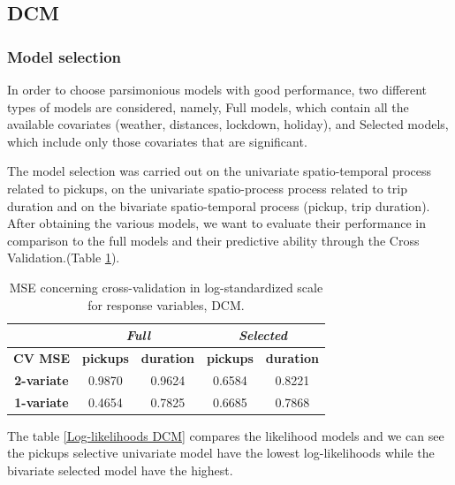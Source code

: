 \subsection{DCM}

\subsubsection{Model selection}
In order to choose  parsimonious models with good performance, two different types of models are considered, namely, Full models, which contain all the available covariates (weather, distances, lockdown, holiday), and Selected models, which include only those covariates that are significant. 

The model selection was carried out on the univariate spatio-temporal process related to pickups, on the univariate spatio-process process related to trip duration and on the bivariate spatio-temporal process (pickup, trip duration).
After obtaining the various models, we want to evaluate their performance in comparison to the full models and their predictive ability through the Cross Validation.(Table \ref{Cross-validation mean squared errors DCM}).

\begin{table}
	\centering
	\renewcommand\arraystretch{1.3}
	\begin{tabular}{c|cc|cc}
		\hline
		\multicolumn{1}{l|}{} & \multicolumn{2}{c|}{\textit{Full}} & \multicolumn{2}{c}{\textit{Selected} }\\ 
		\hline
		\textbf{CV MSE} & \multicolumn{1}{c|}{\textbf{pickups }} & \textbf{duration} & \multicolumn{1}{c|}{\textbf{pickups}} & \textbf{duration} \\ 
		\hline
		\textbf{2-variate } & \multicolumn{1}{c|}{0.9870}  & 0.9624   & \multicolumn{1}{c|}{0.6584}  & 0.8221   \\ 
		\hline
		\textbf{1-variate } & \multicolumn{1}{c|}{0.4654}  & 0.7825   & \multicolumn{1}{c|}{0.6685}  & 0.7868   \\ 
		\hline
	\end{tabular}
	\caption[MSE concerning cross-validation in log-standardized scale for response variables (DCM)]{MSE concerning cross-validation in log-standardized scale for response variables, DCM.}
	\label{Cross-validation mean squared errors DCM}
\end{table}

The  table \ref{Log-likelihoods DCM} compares the likelihood models and we can see the pickups selective univariate model have the lowest log-likelihoods while the bivariate selected model have the highest.

